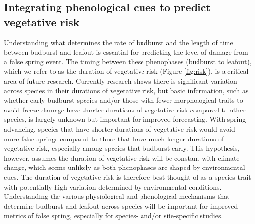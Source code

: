 \documentclass{article}\usepackage[]{graphicx}\usepackage[]{color}
\begin{document}
\subsection*{Integrating phenological cues to predict vegetative risk}
Understanding what determines the rate of budburst and the length of time between budburst and leafout is essential for predicting the level of damage from a false spring event. The timing between these phenophases (budburst to leafout), which we refer to as the duration of vegetative risk (Figure \ref{fig:risk}), is a critical area of future research. Currently research shows there is significant variation across species in their durations of vegetative risk, but basic information, such as whether early-budburst species and/or those with fewer morphological traits to avoid freeze damage have shorter durations of vegetative risk compared to other species, is largely unknown but important for improved forecasting. With spring advancing, species that have shorter durations of vegetative risk would avoid more false springs compared to those that have much longer durations of vegetative risk, especially among species that budburst early. This hypothesis, however, assumes the duration of vegetative risk will be constant with climate change, which seems unlikely as both phenophases are shaped by environmental cues. The duration of vegetative risk is therefore best thought of as a species-trait with potentially high variation determined by environmental conditions. Understanding the various physiological and phenological mechanisms that determine budburst and leafout across species will be important for improved metrics of false spring, especially for species- and/or site-specific studies. 
\end{document}
